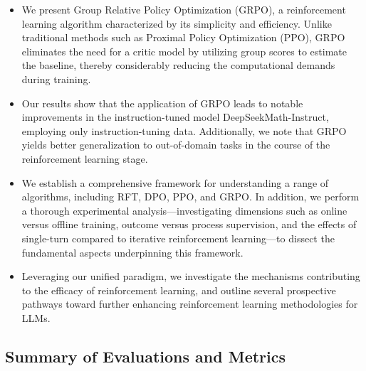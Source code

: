 \begin{itemize}[topsep=0pt]
    \item We present Group Relative Policy Optimization (GRPO), a reinforcement learning algorithm characterized by its simplicity and efficiency. Unlike traditional methods such as Proximal Policy Optimization (PPO), GRPO eliminates the need for a critic model by utilizing group scores to estimate the baseline, thereby considerably reducing the computational demands during training.
    \item Our results show that the application of GRPO leads to notable improvements in the instruction-tuned model DeepSeekMath-Instruct, employing only instruction-tuning data. Additionally, we note that GRPO yields better generalization to out-of-domain tasks in the course of the reinforcement learning stage.
    \item We establish a comprehensive framework for understanding a range of algorithms, including RFT, DPO, PPO, and GRPO. In addition, we perform a thorough experimental analysis—investigating dimensions such as online versus offline training, outcome versus process supervision, and the effects of single-turn compared to iterative reinforcement learning—to dissect the fundamental aspects underpinning this framework.
    \item Leveraging our unified paradigm, we investigate the mechanisms contributing to the efficacy of reinforcement learning, and outline several prospective pathways toward further enhancing reinforcement learning methodologies for LLMs.
\end{itemize}

\subsection{Summary of Evaluations and Metrics}

